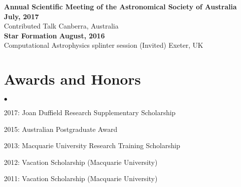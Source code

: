 \documentclass[margin,line]{res}
\newenvironment{list2}{
	\begin{list}{$\bullet$}{%
			\setlength{\itemsep}{0in}
			\setlength{\parsep}{0in} \setlength{\parskip}{0in}
			\setlength{\topsep}{0in} \setlength{\partopsep}{0in} 
			\setlength{\leftmargin}{0.2in}}}{\end{list}}
\begin{document}
\begin{resume}
		{\bf Annual Scientific Meeting of the Astronomical Society of Australia} \hfill {\bf July, 2017}\\
		Contributed Talk \hfill Canberra, Australia\\
		{\bf Star Formation} \hfill {\bf August, 2016}\\
		Computational Astrophysics splinter session (Invited) \hfill Exeter, UK
		
		\section{\sc Awards and Honors}
		\begin{list2}
			\item 2017: Joan Duffield Research Supplementary Scholarship
			\item 2015: Australian Postgraduate Award
			\item 2013: Macquarie University Research Training Scholarship
			\item 2012: Vacation Scholarship (Macquarie University)
			\item 2011: Vacation Scholarship (Macquarie University)
		\end{list2}
		

\end{resume}
\end{document}
